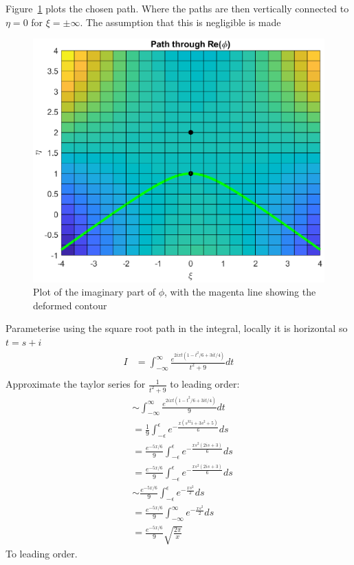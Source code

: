 \documentclass{X:/Documents/Coding/Latex/myassignment}
\begin{document}
\begin{enumerate}
\begin{enumerate}
		Figure~\ref{fig:q1path} plots the chosen path. Where the paths are then vertically connected to $\eta=0$ for $\xi=\pm \infty$. The assumption that this is negligible is made
		\begin{figure}[tbh]
			\centering
			\includegraphics[width=0.8\linewidth]{TopicCA5Q1path.eps}
			\caption{Plot of the imaginary part of $\phi$, with the magenta line showing the deformed contour}
			\label{fig:q1path}
		\end{figure}



		Parameterise using the square root path in the integral, locally it is horizontal so $t = s+i$
		\begin{align*}
			I &= \int_{-\infty}^{\infty} \frac{e^{2ixt(1-t^2/6+3it/4)}}{t^2+9} dt\\
			\end{align*}
			Approximate the taylor series for $\frac{1}{t^2+9}$ to leading order:
		\begin{align*}
			&\sim \int_{-\infty}^{\infty} \frac{e^{2ixt(1-t^2/6+3it/4)}}{9} dt\\
			&=\frac19\int_{-\epsilon}^{\epsilon}e^{-\frac{x\left(s^32i+3s^2+5\right)}{6}} ds\\
			&=\frac{e^{-5x/6}}{9}\int_{-\epsilon}^{\epsilon}e^{-\frac{xs^2\left(2is+3\right)}{6}} ds\\
			&= \frac{e^{-5x/6}}{9}\int_{-\epsilon}^{\epsilon}e^{-\frac{xs^2\left(2is+3\right)}{6}}ds\\
			&\sim \frac{e^{-5x/6}}{9}\int_{-\epsilon}^{\epsilon}e^{-\frac{xs^2}{2}} ds\\
			&= \frac{e^{-5x/6}}{9}\int_{-\infty}^{\infty}e^{-\frac{xs^2}{2}} ds\\
			&=\frac{e^{-5x/6}}{9} \sqrt{\frac{2\pi}{x}}
		\end{align*}
		To leading order.



\end{enumerate}
\end{enumerate}
\end{document}
